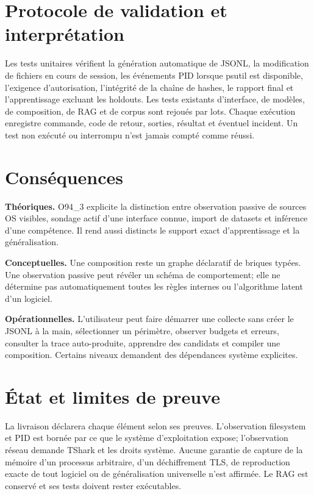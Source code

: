 \documentclass[11pt,a4paper]{article}
\begin{document}
\section{Protocole de validation et interprétation}
Les tests unitaires vérifient la génération automatique de JSONL, la modification de fichiers en cours de session, les événements PID lorsque psutil est disponible, l'exigence d'autorisation, l'intégrité de la chaîne de hashes, le rapport final et l'apprentissage excluant les holdouts. Les tests existants d'interface, de modèles, de composition, de RAG et de corpus sont rejoués par lots. Chaque exécution enregistre commande, code de retour, sorties, résultat et éventuel incident. Un test non exécuté ou interrompu n'est jamais compté comme réussi.

\section{Conséquences}
\textbf{Théoriques.} O94\_3 explicite la distinction entre observation passive de sources OS visibles, sondage actif d'une interface connue, import de datasets et inférence d'une compétence. Il rend aussi distincts le support exact d'apprentissage et la généralisation.

\textbf{Conceptuelles.} Une composition reste un graphe déclaratif de briques typées. Une observation passive peut révéler un schéma de comportement; elle ne détermine pas automatiquement toutes les règles internes ou l'algorithme latent d'un logiciel.

\textbf{Opérationnelles.} L'utilisateur peut faire démarrer une collecte sans créer le JSONL à la main, sélectionner un périmètre, observer budgets et erreurs, consulter la trace auto-produite, apprendre des candidats et compiler une composition. Certains niveaux demandent des dépendances système explicites.

\section{État et limites de preuve}
La livraison déclarera chaque élément selon ses preuves. L'observation filesystem et PID est bornée par ce que le système d'exploitation expose; l'observation réseau demande TShark et les droits système. Aucune garantie de capture de la mémoire d'un processus arbitraire, d'un déchiffrement TLS, de reproduction exacte de tout logiciel ou de généralisation universelle n'est affirmée. Le RAG est conservé et ses tests doivent rester exécutables.
\end{document}

